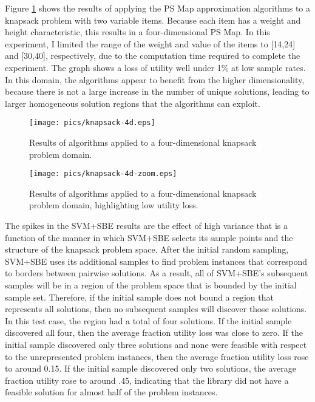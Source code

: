 Figure \ref{fig:knapsack-4d} shows the results of applying the PS Map approximation algorithms to a knapsack problem with two variable items.  Because each item has a weight and height characteristic, this results in a four-dimensional PS Map.  In this experiment, I limited the range of the weight and value of the items to [14,24] and [30,40], respectively, due to the computation time required to complete the experiment.  The graph shows a loss of utility well under 1\% at low sample rates.  In this domain, the algorithms appear to benefit from the higher dimensionality, because there is not a large increase in the number of unique solutions, leading to larger homogeneous solution regions that the algorithms can exploit.

\begin{figure}
\begin{center}
\texttt{[image: pics/knapsack-4d.eps]}
\caption{Results of algorithms applied to a four-dimensional knapsack problem domain.}
\label{fig:knapsack-4d}
\end{center}
\end{figure}

\begin{figure}
\begin{center}
\texttt{[image: pics/knapsack-4d-zoom.eps]}
\caption{Results of algorithms applied to a four-dimensional knapsack problem domain, highlighting low utility loss.}
\label{fig:knapsack-4d-zoom}
\end{center}
\end{figure}



The spikes in the SVM+SBE results are the effect of high variance that is a function of the manner in which SVM+SBE selects its sample points and the structure of the knapsack problem space.  After the initial random sampling, SVM+SBE uses its additional samples to find problem instances that correspond to borders between pairwise solutions. As a result, all of SVM+SBE's subsequent samples will be in a region of the problem space that is bounded by the initial sample set.  Therefore, if the initial sample does not bound a region that represents all solutions, then no subsequent samples will discover those solutions.  In this test case, the region had a total of four solutions.  If the initial sample discovered all four, then the average fraction utility loss was close to zero.  If the initial sample discovered only three solutions and none were feasible with respect to the unrepresented problem instances, then the average fraction utility loss rose to around 0.15.  If the initial sample discovered only two solutions, the average fraction utility rose to around .45, indicating that the library did not have a feasible solution for almost half of the problem instances.

